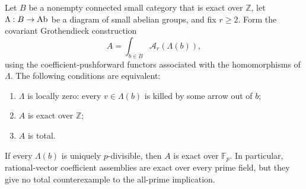\begin{theorem}
\label{C4:grothendieck-exclusion}
Let $B$ be a nonempty connected small category that is exact over
$\mathbb Z$, let $\Lambda:B\to\mathrm{Ab}$ be a diagram of small abelian
groups, and fix $r\geq2$.
Form the covariant Grothendieck construction
\[
 A=\int_{b\in B}\mathcal A_r(\Lambda(b)),
 \tag{GA.1}
\]
using the coefficient-pushforward functors associated with the
homomorphisms of $\Lambda$. The following conditions are equivalent:
\begin{enumerate}
\item $\Lambda$ is locally zero: every $v\in \Lambda(b)$ is killed by
some arrow out of $b$;
\item $A$ is exact over $\mathbb Z$;
\item $A$ is total.
\end{enumerate}
If every $\Lambda(b)$ is uniquely $p$-divisible, then $A$ is
exact over $\mathbb F_p$. In particular, rational-vector coefficient
assemblies are exact over every prime field, but they give no total
counterexample to the all-prime implication.
\end{theorem}
